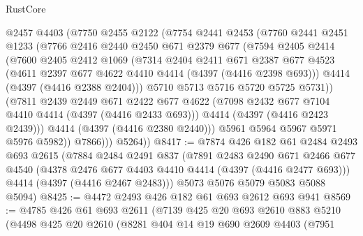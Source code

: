 \begin{lexlean}{RustCore}
\begin{coremodule}
            @2457
            @4403
            (@7750
              @2455
              @2122
              (@7754
                @2441
                @2453
                (@7760
                  @2441
                  @2451
                  @1233
                  (@7766
                    @2416
                    @2440
                    @2450
                    @671
                    @2379
                    @677
                    (@7594
                      @2405
                      @2414
                      (@7600
                        @2405
                        @2412
                        @1069
                        (@7314
                          @2404
                          @2411
                          @671
                          @2387
                          @677
                          @4523
                          (@4611 @2397 @677 @4622 @4410 @4414 (@4397 (@4416 @2398 @693)))
                          @4414
                          (@4397 (@4416 @2388 @2404)))
                        @5710
                        @5713
                        @5716
                        @5720
                        @5725
                        @5731))
                    (@7811
                      @2439
                      @2449
                      @671
                      @2422
                      @677
                      @4622
                      (@7098 @2432 @677 @7104 @4410 @4414 (@4397 (@4416 @2433 @693)))
                      @4414
                      (@4397 (@4416 @2423 @2439)))
                    @4414
                    (@4397 (@4416 @2380 @2440)))
                  @5961
                  @5964
                  @5967
                  @5971
                  @5976
                  @5982))
              @7866)))
        @5264))
@8417 := @7874
    @426
    @182
    @61
    @2484
    @2493
    @693
    @2615
    (@7884
      @2484
      @2491
      @837
      (@7891
        @2483
        @2490
        @671
        @2466
        @677
        @4540
        (@4378 @2476 @677 @4403 @4410 @4414 (@4397 (@4416 @2477 @693)))
        @4414
        (@4397 (@4416 @2467 @2483)))
      @5073
      @5076
      @5079
      @5083
      @5088
      @5094)
@8425 := @4472 @2493 @426 @182 @61 @693 @2612 @693 @941
@8569 := @4785
    @426
    @61
    @693
    @2611
    (@7139
      @425
      @20
      @693
      @2610
      @883
      @5210
      (@4498
        @425
        @20
        @2610
        (@8281
          @404
          @14
          @19
          @690
          @2609
          @4403
          (@7951

\end{coremodule}
\end{lexlean}
